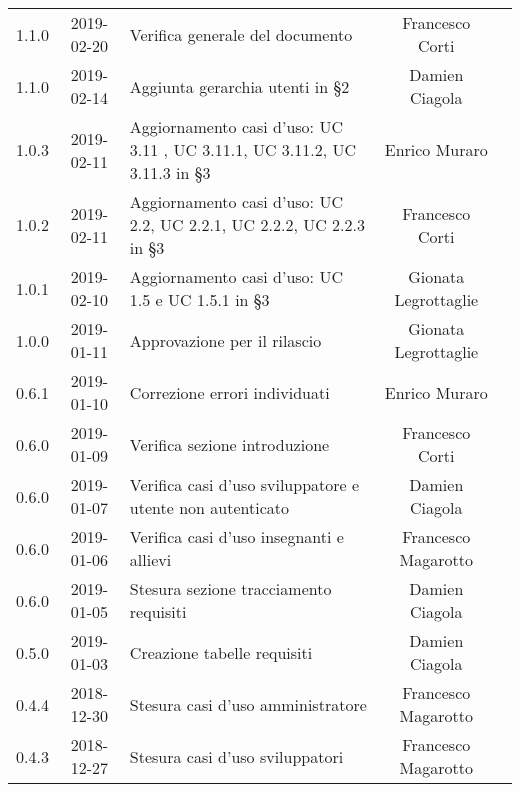 {\begin{longtable}{ c c C{6cm} c c }
		1.1.0 &
		2019-02-20 &
		Verifica generale del documento&
		Francesco Corti&
		\reda{} \\		
				
		1.1.0 &
		2019-02-14 &
		Aggiunta gerarchia utenti in §2 &
		Damien Ciagola&
		\reda{} \\
		
		1.0.3 &
		2019-02-11 &
		Aggiornamento casi d'uso: UC 3.11 , UC 3.11.1, UC 3.11.2, UC 3.11.3 in §3 &
		Enrico Muraro&
		\reda{} \\
		
		1.0.2 &
		2019-02-11 &
		Aggiornamento casi d'uso: UC 2.2, UC 2.2.1, UC 2.2.2, UC 2.2.3 in §3 &
		Francesco Corti&
		\reda{} \\

		1.0.1 &
		2019-02-10 &
		Aggiornamento casi d'uso: UC 1.5 e UC 1.5.1 in §3 &
		Gionata Legrottaglie&
		\reda{} \\

		1.0.0 &
		2019-01-11 &
		Approvazione per il rilascio &	
		Gionata Legrottaglie&	
		\Res{} \\
		
		0.6.1 & 
		2019-01-10 &  
		Correzione errori individuati &	
		Enrico Muraro&	
		\reda{} \\
		
		0.6.0 & 
		2019-01-09 &  
		Verifica sezione introduzione &	
		Francesco Corti&	
		\ver{} \\
		
		0.6.0 & 
		2019-01-07 &  
		Verifica casi d'uso sviluppatore e utente non autenticato& 	
		Damien Ciagola  &	
		\ver{} \\
		
		0.6.0 & 
		2019-01-06 &  
		Verifica casi d'uso insegnanti e allievi & 
		Francesco Magarotto  &
		\ver{}  \\
		
		0.6.0 & 
		2019-01-05 &  
		Stesura sezione tracciamento requisiti &	
		Damien Ciagola &	
		\reda{} \\
		
		0.5.0 & 
		2019-01-03 &  
		Creazione tabelle requisiti&	
		Damien Ciagola &	
		\reda{} \\
		
		0.4.4 & 
		2018-12-30 &  
		Stesura casi d'uso amministratore &	
		Francesco Magarotto &	
		\reda{} \\
		
		0.4.3 & 
		2018-12-27 &  
		Stesura casi d'uso sviluppatori &	
		Francesco Magarotto &	
		\reda{} \\
		

\end{longtable}}
